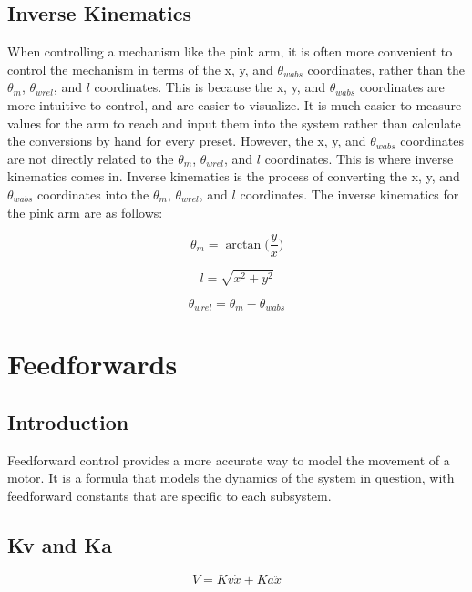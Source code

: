 \documentclass{scrartcl}
\begin{document}
\subsection{Inverse Kinematics}
When controlling a mechanism like the pink arm, it is often more convenient to control the mechanism in terms of the x, y, and \(\theta_{wabs}\) coordinates, rather than the \(\theta_m\), \(\theta_{wrel}\), and \(l\) coordinates. This is because the x, y, and \(\theta_{wabs}\) coordinates are more intuitive to control, and are easier to visualize. It is much easier to measure values for the arm to reach and input them into the system rather than calculate the conversions by hand for every preset. However, the x, y, and \(\theta_{wabs}\) coordinates are not directly related to the \(\theta_m\), \(\theta_{wrel}\), and \(l\) coordinates. This is where inverse kinematics comes in. Inverse kinematics is the process of converting the x, y, and \(\theta_{wabs}\) coordinates into the \(\theta_m\), \(\theta_{wrel}\), and \(l\) coordinates. The inverse kinematics for the pink arm are as follows:

\begin{equation} \label{theta_m}
    \theta_m = \arctan\biggl(\frac{y}{x}\biggl)
\end{equation}

\begin{equation} \label{l}
    l = \sqrt{x^2 + y^2}
\end{equation}

\begin{equation} \label{theta_wrel}
    \theta_{wrel} = \theta_m - \theta_{wabs}
\end{equation}

\section{Feedforwards}

\subsection{Introduction}
Feedforward control provides a more accurate way to model the movement of a motor. It is a formula that models the dynamics of the system in question, with feedforward constants that are specific to each subsystem.

\subsection{Kv and Ka}
\begin{equation} \label{Motor Feedforward Equation}
    V = Kv \dot{x} + Ka \ddot{x}
\end{equation}
\end{document}
